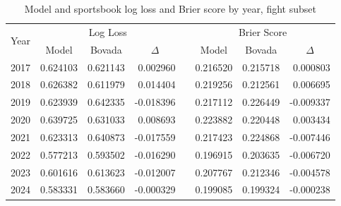 \documentclass[12pt,twoside]{report}
\begin{document}
\begin{table}[!htb]
\centering
\begin{tabular}{cccrlccr} 
\toprule
\multirow{2}{*}{Year} & \multicolumn{3}{c}{Log Loss}                       &  & \multicolumn{3}{c}{Brier Score}                     \\ 
\cmidrule[\heavyrulewidth]{2-4}\cmidrule[\heavyrulewidth]{6-8}
                      & Model    & Bovada   & \multicolumn{1}{c}{$\Delta$} &  & Model    & Bovada   & \multicolumn{1}{c}{$\Delta$}  \\ 
\toprule
2017                  & 0.624103 & 0.621143 & 0.002960                     &  & 0.216520 & 0.215718 & 0.000803                      \\
2018                  & 0.626382 & 0.611979 & 0.014404                     &  & 0.219256 & 0.212561 & 0.006695                      \\
2019                  & 0.623939 & 0.642335 & -0.018396                    &  & 0.217112 & 0.226449 & -0.009337                     \\
2020                  & 0.639725 & 0.631033 & 0.008693                     &  & 0.223882 & 0.220448 & 0.003434                      \\
2021                  & 0.623313 & 0.640873 & -0.017559                    &  & 0.217423 & 0.224868 & -0.007446                     \\
2022                  & 0.577213 & 0.593502 & -0.016290                    &  & 0.196915 & 0.203635 & -0.006720                     \\
2023                  & 0.601616 & 0.613623 & -0.012007                    &  & 0.207767 & 0.212346 & -0.004578                     \\
2024                  & 0.583331 & 0.583660 & -0.000329                    &  & 0.199085 & 0.199324 & -0.000238                     \\
\bottomrule
\end{tabular}
\caption{Model and sportsbook log loss and Brier score by year, fight subset}
\end{table}
\end{document}
